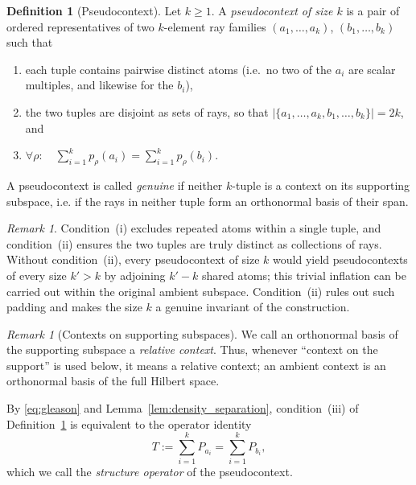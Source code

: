 \documentclass[
  twocolumn,
  aps,
  pra,
  floatfix,
  amsmath,amssymb,
  longbibliography
]{revtex4-2}
\theoremstyle{definition}
\newtheorem{definition}[theorem]{Definition}
\theoremstyle{remark}
\newtheorem{remark}[theorem]{Remark}
\begin{document}
\begin{definition}[Pseudocontext]\label{def:pc}
Let $k\ge 1$.  A \emph{pseudocontext of size $k$} is a pair of
ordered representatives of two $k$-element ray families
$(a_1,\ldots,a_k)$, $(b_1,\ldots,b_k)$ such that
\begin{enumerate}
  \item[(i)]  each tuple contains pairwise distinct atoms (i.e.\ no
              two of the $a_i$ are scalar multiples, and likewise for
              the $b_i$),
  \item[(ii)] the two tuples are disjoint as sets of rays, so that
              $|\{a_1,\ldots,a_k,b_1,\ldots,b_k\}|=2k$, and
  \item[(iii)] $\displaystyle\forall\rho:\quad
               \sum_{i=1}^{k}p_\rho(a_i)=\sum_{i=1}^{k}p_\rho(b_i)$.
\end{enumerate}
A pseudocontext is called \emph{genuine} if neither $k$-tuple is a
context on its supporting subspace, i.e. if the rays in neither tuple
form an orthonormal basis of their span.
\end{definition}

\begin{remark}
Condition~(i) excludes repeated atoms within a single tuple, and
condition~(ii) ensures the two tuples are truly distinct as collections
of rays. Without condition~(ii), every pseudocontext of size $k$
would yield pseudocontexts of every size $k'>k$ by adjoining $k'-k$
shared atoms; this trivial inflation can be carried out within the
original ambient subspace.
Condition~(ii) rules out such
padding and makes the size $k$ a genuine invariant of the construction.
\end{remark}

\begin{remark}[Contexts on supporting subspaces]
We call an orthonormal basis of the supporting subspace a \emph{relative
context}.  Thus, whenever ``context on the support'' is used below, it
means a relative context; an ambient context is an orthonormal basis of
the full Hilbert space.
\end{remark}

By \eqref{eq:gleason} and Lemma~\ref{lem:density_separation},
condition~(iii) of Definition~\ref{def:pc} is equivalent to the
operator identity
\begin{equation}
  T:=\sum_{i=1}^{k}P_{a_i}=\sum_{i=1}^{k}P_{b_i},
  \label{eq:opid}
\end{equation}
which we call the \emph{structure operator} of the pseudocontext.
\end{document}
